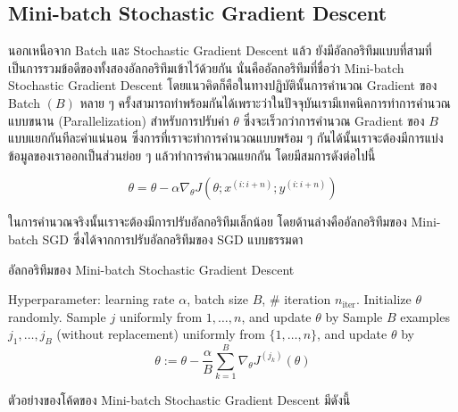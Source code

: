 \subsection{Mini-batch Stochastic Gradient Descent}
\label{ssec:minibatch_grad}

นอกเหนือจาก Batch และ Stochastic Gradient Descent แล้ว ยังมีอัลกอริทึมแบบที่สามที่เป็นการรวมข้อดีของทั้งสองอัลกอริทึมเข้าไว้ด้วยกัน
นั่นคืออัลกอริทึมที่ชื่อว่า Mini-batch Stochastic Gradient Descent โดยแนวคิดก็คือในทางปฏิบัตินั้นการคำนวณ Gradient ของ Batch
$(B)$ หลาย ๆ ครั้งสามารถทำพร้อมกันได้เพราะว่าในปัจจุบันเรามีเทคนิคการทำการคำนวณแบบขนาน (Parallelization) สำหรับการปรับค่า
$\theta$ ซึ่งจะเร็วกว่าการคำนวณ Gradient ของ $B$ แบบแยกกันทีละค่าแน่นอน ซึ่งการที่เราจะทำการคำนวณแบบพร้อม ๆ กันได้นั้นเราจะต้องมีการแบ่งข้อมูลของเราออกเป็นส่วนย่อย ๆ แล้วทำการคำนวณแยกกัน โดยมีสมการดังต่อไปนี้

\begin{equation}\label{eq:minibatch}
    \theta = \theta - \alpha\nabla_\theta J( \theta; x^{(i:i+n)}; y^{(i:i+n)})
\end{equation}

ในการคำนวณจริงนั้นเราจะต้องมีการปรับอัลกอริทึมเล็กน้อย โดยด้านล่างคืออัลกอริทึมของ Mini-batch SGD ซึ่งได้จากการปรับอัลกอริทึมของ SGD
แบบธรรมดา

\begin{algorithm}[H]
    \caption{อัลกอริทึมของ Mini-batch Stochastic Gradient Descent}
    \label{alg:minibatch}
    \begin{algorithmic}
        \State Hyperparameter: learning rate $\alpha$, batch size $B$, \# iteration $n_\text{iter}$.
        \State Initialize $\theta$ randomly.
        \State Sample $j$ uniformly from ${1,\ldots,n}$, and update $\theta$ by
        \State Sample $B$ examples $j_1,\ldots,j_B$ (without replacement) uniformly from $\{1,\ldots,n\}$,
        and update $\theta$ by
        \begin{equation*}
            \theta := \theta - \frac{\alpha}{B}\sum_{k=1}^B\nabla_\theta J^{(j_k)}(\theta)
        \end{equation*}
        \EndFor
    \end{algorithmic}
\end{algorithm}

\noindent ตัวอย่างของโค้ดของ Mini-batch Stochastic Gradient Descent มีดังนี้

